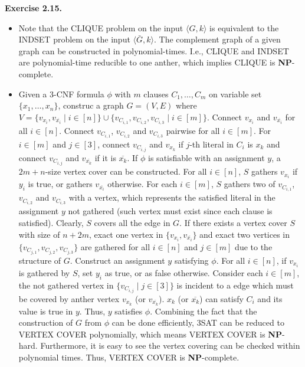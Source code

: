 \documentclass[a4paper]{article}
\newenvironment{exercise}[1]{
	\par
	\noindent\textbf{Exercise #1.}\quad
}{
	\par
	\bigskip
}
\begin{document}
	\begin{exercise}{2.15}
		\begin{itemize}
			\item Note that the \textsf{CLIQUE} problem on the input $\langle G,k\rangle$ is equivalent to the \textsf{INDSET} problem on the input $\langle \bar G, k\rangle$. The complement graph of a given graph can be constructed in polynomial-times. I.e., \textsf{CLIQUE} and \textsf{INDSET} are polynomial-time reducible to one anther, which implies \textsf{CLIQUE} is \textbf{NP}-complete.

			\item Given a 3-CNF formula $\phi$ with $m$ clauses $C_1, \ldots, C_m$ on variable set $\{x_1,\ldots,x_n\}$, construc a graph $G = (V,E)$ where $V = \{v_{x_i}, v_{\overline{x_i}} \mid i \in [n]\} \cup \{v_{C_{i,1}}, v_{C_{i,2}}, v_{C_{i,3}} \mid i\in [m]\}$. Connect $v_{x_i}$ and $v_{\overline{x_i}}$ for all $i\in [n]$. Connect $v_{C_{i,1}}$, $v_{C_{i,2}}$ and $v_{C_{i,3}}$ pairwise for all $i \in [m]$. For $i \in [m]$ and $j \in [3]$, connect $v_{C_{i,j}}$ and $v_{x_k}$ if $j$-th literal in $C_i$ is $x_k$ and connect $v_{C_{i,j}}$ and $v_{\overline{x_k}}$ if it is $\overline{x_k}$. If $\phi$ is satisfiable with an assignment $y$, a $2m+n$-size vertex cover can be constructed. For all $i\in [n]$, $S$ gathers $v_{x_i}$ if $y_i$ is true, or gathers $v_{\overline{x_i}}$ otherwise. For each $i \in [m]$, $S$ gathers two of $v_{C_{i,1}}$, $v_{C_{i,2}}$ and $v_{C_{i,3}}$ with a vertex, which represents the satisfied literal in the assignment $y$ not gathered (such vertex must exist since each clause is satisfied). Clearly, $S$ covers all the edge in $G$. If there exists a vertex cover $S$ with size of $n+2m$, exact one vertex in $\{v_{x_i}, v_{\overline{x_i}}\}$ and exact two vertices in $\{v_{C_{j,1}}, v_{C_{j,2}}, v_{C_{j,3}}\}$ are gathered for all $i \in [n]$ and $j\in [m]$ due to the structure of $G$. Construct an assignment $y$ satisfying $\phi$. For all $i\in [n]$, if $v_{x_i}$ is gathered by $S$, set $y_i$ as true, or as false otherwise. Consider each $i\in [m]$, the not gathered vertex in $\{v_{C_{i,j}}\mid j\in [3]\}$ is incident to a edge which must be covered by anther vertex $v_{x_k}$ (or $v_{\overline{x_k}}$). $x_k$ (or $\overline{x_k}$) can satisfy $C_i$ and its value is true in $y$. Thus, $y$ satisfies $\phi$. Combining the fact that the construction of $G$ from $\phi$ can be done efficiently, \textsf{3SAT} can be reduced to \textsf{VERTEX COVER} polynomially, which means \textsf{VERTEX COVER} is \textbf{NP}-hard. Furthermore, it is easy to see the vertex covering can be checked within polynomial times. Thus, \textsf{VERTEX COVER} is \textbf{NP}-complete.		
		\end{itemize}
	\end{exercise}
\end{document}
